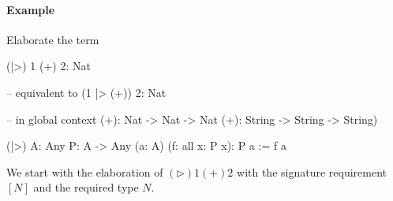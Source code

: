 \paragraph{Example}
Elaborate the term
\begin{alba}
    (|>) 1 (+) 2: Nat

    -- equivalent to
    (1 |> (+)) 2: Nat

    -- in global context
    (+): Nat -> Nat -> Nat
    (+): String -> String -> String)

    (|>) {A: Any} {P: A -> Any} (a: A) (f: all x: P x): P a
    :=
        f a
\end{alba}


We start with the elaboration of $(\triangleright) 1 (+) 2$ with the signature
requirement $[N]$ and the required type $N$.

